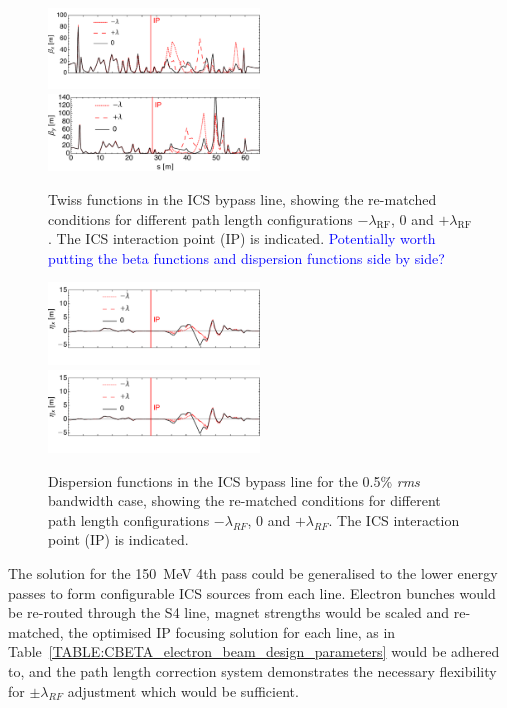 \documentclass[../main.tex]{subfiles}
\begin{document}
\begin{figure}[!h]
    \centering
    \includegraphics[width=0.5\textwidth]{Figures/CBETA_Inverse_Compton_Source_Design/twissplotx.pdf}
    \includegraphics[width=0.5\textwidth]{Figures/CBETA_Inverse_Compton_Source_Design/twissploty.pdf}
    \caption{Twiss functions in the ICS bypass line, showing the re-matched conditions for different path length configurations $-\lambda_{\mathrm{RF}}$, $0$ and $+\lambda_{\mathrm{RF}}$. The ICS interaction point (IP) is indicated. \textcolor{blue}{Potentially worth putting the beta functions and dispersion functions side by side?}}
    \label{fig:CBETA_ICS_Twiss}
\end{figure}

\begin{figure}[!h]
\centering
\includegraphics[width=0.5\textwidth]{Figures/CBETA_Inverse_Compton_Source_Design/dispplotx.pdf}
\includegraphics[width=0.5\textwidth]{Figures/CBETA_Inverse_Compton_Source_Design/dispplotx.pdf}
\caption{Dispersion functions in the ICS bypass line for the 0.5\% \textit{rms} bandwidth case, showing the re-matched conditions for different path length configurations $-\lambda_{RF}$, $0$ and $+\lambda_{RF}$. The ICS interaction point (IP) is indicated.}
\label{fig:CBETA_ICS_dispersion}
\end{figure}

The solution for the 150~\si{\mega\electronvolt} 4th pass could be generalised to the lower energy passes to form configurable ICS sources from each line. Electron bunches would be re-routed through the S4 line, magnet strengths would be scaled and re-matched, the optimised IP focusing solution for each line, as in Table~\ref{TABLE:CBETA_electron_beam_design_parameters} would be adhered to, and the path length correction system demonstrates the necessary flexibility for $\pm\lambda_{RF}$ adjustment which would be sufficient.
\end{document}
